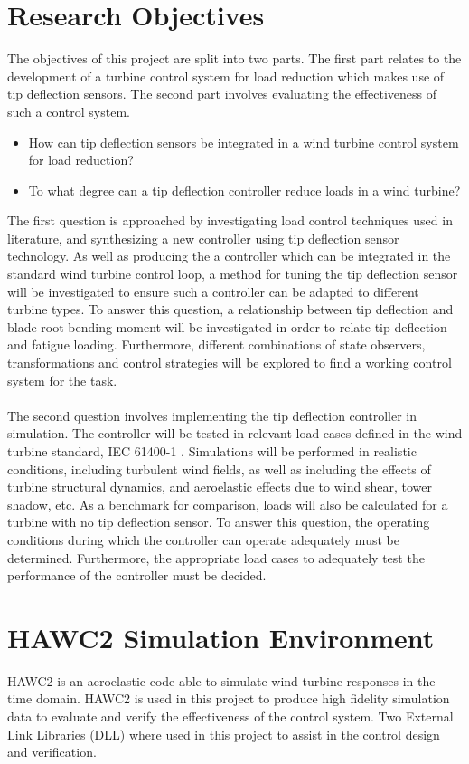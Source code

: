 \section{Research Objectives}
\label{sec:objective}
The objectives of this project are split into two parts. The first part relates to the development of a turbine control system for load reduction which makes use of tip deflection sensors. The second part involves evaluating the effectiveness of such a control system. 
\begin{itemize}
    \item How can tip deflection sensors be integrated in a wind turbine control system for load reduction?
    \item To what degree can a tip deflection controller reduce loads in a wind turbine? 
\end{itemize}
The first question is approached by investigating load control techniques used in literature, and synthesizing a new controller using tip deflection sensor technology. As well as producing the a controller which can be integrated in the standard wind turbine control loop, a method for tuning the tip deflection sensor will be investigated to ensure such a controller can be adapted to different turbine types. To answer this question, a relationship between tip deflection and blade root bending moment will be investigated in order to relate tip deflection and fatigue loading. Furthermore, different combinations of state observers, transformations and control strategies will be explored to find a working control system for the task.
\\~\\
The second question involves implementing the tip deflection controller in simulation. The controller will be tested in relevant load cases defined in the wind turbine standard, IEC 61400-1 \cite{international2005iec}. Simulations will be performed in realistic conditions, including turbulent wind fields, as well as including the effects of turbine structural dynamics, and aeroelastic effects due to wind shear, tower shadow, etc. As a benchmark for comparison, loads will also be calculated for a turbine with no tip deflection sensor. To answer this question, the operating conditions during which the controller can operate adequately must be determined. Furthermore, the appropriate load cases to adequately test the performance of the controller must be decided. 

\section{HAWC2 Simulation Environment}
HAWC2 is an aeroelastic code able to simulate wind turbine responses in the time domain. HAWC2 is used in this project to produce high fidelity simulation data to evaluate and verify the effectiveness of the control system. Two External Link Libraries (DLL) where used in this project to assist in the control design and verification.

